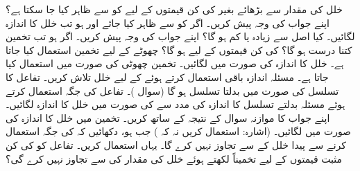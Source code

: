 خلل کی مقدار  سے بڑھائے بغیر  کی کن قیمتوں کے لیے  کو  سے ظاہر کیا جا سکتا ہے؟ اپنے جواب کی وجہ پیش کریں۔
اگر  کو  سے ظاہر کیا جائے اور  ہو تب خلل کا اندازہ لگائیں۔ کیا  اصل سے زیادہ یا کم ہو گا؟ اپنے جواب کی وجہ پیش کریں۔
اگر  ہو تب تخمین  کتنا درست ہو گا؟  کی کن قیمتوں کے لیے  ہو گا؟
چھوٹے  کے لیے تخمین  استعمال کیا جاتا ہے۔ خلل کا اندازہ  کی صورت میں لگائیں۔
تخمین  چھوٹی  کی صورت میں استعمال کیا جاتا ہے۔ مسئلہ اندازہ باقی استعمال کرتے ہوئے  کے لیے خلل تلاش کریں۔
تفاعل  کا تسلسل  کی صورت میں بدلتا تسلسل ہو گا (سوال )۔ تفاعل  کی جگہ  استعمال کرتے ہوئے مسئلہ بدلتے تسلسل کا اندازہ کی مدد سے  کی صورت میں خلل کا اندازہ لگائیں۔ اپنے جواب کا موازنہ سوال  کے نتیجہ کے ساتھ کریں۔  
تخمین  میں   خلل کا اندازہ  کی صورت میں لگائیں۔ (اشارہ:  استعمال کریں نہ  کہ )
جب  ہو، دکھائیں کہ  کی جگہ  استعمال کرنے سے پیدا خلل  کے  سے تجاوز نہیں کرے گا۔ یہاں  استعمال کریں۔
تفاعل  کو  کی کن مثبت قیمتوں کے لیے تخمیناً  لکھتے ہوئے خلل کی مقدار  کی  سے تجاوز نہیں کرے گی؟ 
